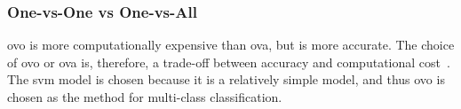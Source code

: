 \subsubsection{One-vs-One vs One-vs-All}\label{subsubsec:one-vs-one-vs-one-vs-all}
\gls{ovo} is more computationally expensive than \gls{ova}, but is more accurate. The choice of \gls{ovo} or \gls{ova} is, therefore, a trade-off between accuracy and computational cost~\cite{james-statistical-learning1}. The \gls{svm} model is chosen because it is a relatively simple model, and thus \gls{ovo} is chosen as the method for multi-class classification. 
